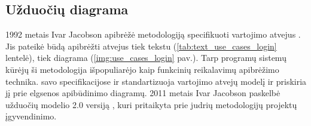 \subsection{Užduočių diagrama}

1992 metais Ivar Jacobson apibrėžė metodologiją specifikuoti vartojimo atvejus \cite{Jacobson1992}. Jis pateikė būdą apibrėžti atvejus tiek tekstu (\ref{tab:text_use_cases_login} lentelė), tiek diagrama (\ref{img:use_cases_login} pav.). Tarp programų sistemų kūrėjų ši metodologija išpopuliarėjo kaip funkcinių reikalavimų apibrėžimo technika. \OMG{} savo specifikacijose \UML{} \cite{omgUmlFormal} ir \SysML{} \cite{OMGSysML} standartizuoja vartojimo atvejų modelį ir priskiria jį prie elgsenos apibūdinimo diagramų. 2011 metais Ivar Jacobson paskelbė užduočių modelio 2.0 versiją \cite{jacobson2011usecase}, kuri pritaikyta prie judrių metodologijų projektų įgyvendinimo.

